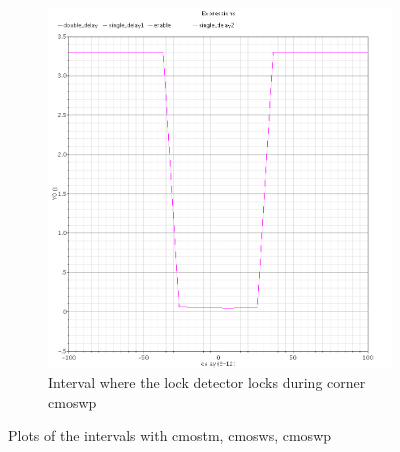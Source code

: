 \documentclass[a4paper,12pt]{article} \usepackage{graphicx}
\begin{document}
\begin{figure}[h]
\begin{subfigure}[b]{.3\textwidth}
        \centering
        \includegraphics[width=\textwidth]{../Bilder/LD_tran/PD_wp.png}
        \caption{Interval where the lock detector locks during corner cmoswp}
\end{subfigure}
\caption{Plots of the intervals with cmostm, cmosws, cmoswp}
\label{fig:LD_tm_wp}
\end{figure}
\end{document}
